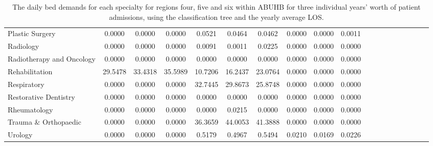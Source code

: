 \documentclass[thesis.tex]{subfiles}
\begin{document}
\begin{landscape}
\begin{table}[h!]
{\begin{tabular}{lcccccccccccccccccc}
Plastic Surgery	&0.0000&	0.0000&	0.0000&	0.0521&	0.0464&	0.0462&	0.0000&	0.0000&	0.0011\\
Radiology&	0.0000&	0.0000&	0.0000&	0.0091&	0.0011&	0.0225&	0.0000&	0.0000&	0.0000\\
Radiotherapy and Oncology&	0.0000&	0.0000&	0.0000&	0.0000&	0.0000&	0.0000&	0.0000&	0.0000&	0.0000\\
Rehabilitation&	29.5478&	33.4318&	35.5989&	10.7206&	16.2437&	23.0764&	0.0000&	0.0000&	0.0000\\
Respiratory&	0.0000&	0.0000&	0.0000&	32.7445&	29.8673&	25.8748&	0.0000&	0.0000&	0.0000\\
Restorative Dentistry	&0.0000&	0.0000&	0.0000&	0.0000&	0.0000&	0.0000&	0.0000&	0.0000&	0.0000\\
Rheumatology&	0.0000&	0.0000&	0.0000&	0.0000&	0.0215&	0.0000&	0.0000&	0.0000&	0.0000\\
Trauma \& Orthopaedic&	0.0000&	0.0000&	0.0000&	36.3659&	44.0053&	41.3888&	0.0000&	0.0000&	0.0000\\
Urology&	0.0000&	0.0000&	0.0000&	0.5179&	0.4967&	0.5494&	0.0210&	0.0169&	0.0226\\
\bottomrule
\end{tabular}  } 
\caption{The daily bed demands for each specialty for regions four, five and six within ABUHB for three individual years’ worth of patient admissions, using the classification tree and the yearly average LOS.}
    \label{apptab:LinkedDemands8b}
\end{table}

    
\end{landscape}
\end{document}
